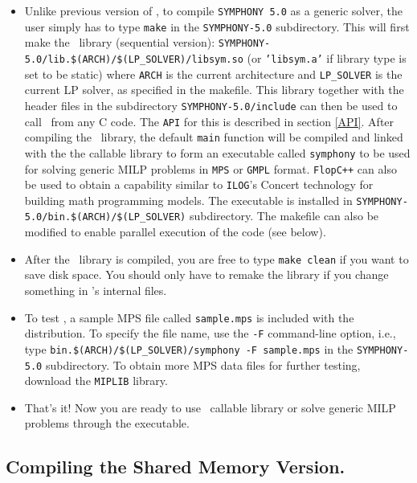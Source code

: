 \begin{itemize}

      \item Unlike previous version of \BB, to compile \texttt{SYMPHONY 5.0} as 
a generic solver, the user simply has to type \texttt{make} in the 
\texttt{SYMPHONY-5.0} subdirectory. This will 
first make the \BB\ library (sequential version): 
\texttt{SYMPHONY-5.0/lib.\$(ARCH)/\$(LP\_SOLVER)/libsym.so} (or 
\texttt{'libsym.a'} if library type is set to be static) where 
\texttt{ARCH} is the current architecture and \texttt{LP\_SOLVER} is the 
current LP solver, as specified in the makefile. This library together
with the header files in the subdirectory \texttt{SYMPHONY-5.0/include} can 
then be used to call \BB\ from any C code. The \texttt{API} for this is 
described in section \ref{API}.
After compiling the \BB\ library, the default \texttt{main} function will 
be compiled and linked with the the callable library to form an executable
called \texttt{symphony} to be used for solving generic MILP problems 
in \texttt{MPS} or \texttt{GMPL} format. \texttt{FlopC++} can also be used to 
obtain a capability similar to \texttt{ILOG}'s Concert technology for building 
math programming models. The executable is installed in 
\texttt{SYMPHONY-5.0/bin.\$(ARCH)/\$(LP\_SOLVER)} subdirectory. The makefile 
can also be modified to enable parallel execution of the code (see below).


\item After the \BB\ library is compiled, you are free to type {\tt make
        clean} if you want to save disk space. You should only have to
        remake the library if you change something in \BB's internal files. 

\item To test \BB, a sample MPS file called \texttt{sample.mps} is 
included with the distribution. To specify the file name, use the 
\texttt{-F} command-line option, i.e., type 
\texttt{bin.\$(ARCH)/\$(LP\_SOLVER)/symphony -F sample.mps} in the
\texttt{SYMPHONY-5.0} subdirectory. To obtain more MPS data files for further
testing, download the \texttt{MIPLIB} library.

\item That's it! Now you are ready to use \BB\ callable library or 
solve generic MILP problems through the executable.

\end{itemize}

\subsection{Compiling the Shared Memory Version.}

